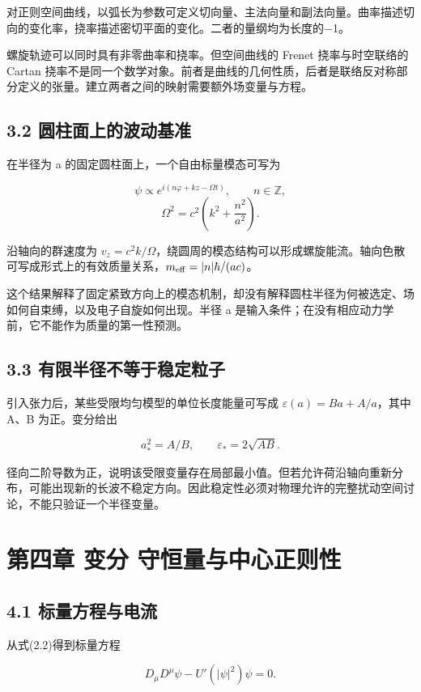 \documentclass[UTF8,fontset=fandol,11pt]{ctexart}
\begin{document}
对正则空间曲线，以弧长为参数可定义切向量、主法向量和副法向量。曲率描述切向的变化率，挠率描述密切平面的变化。二者的量纲均为长度的−1。

螺旋轨迹可以同时具有非零曲率和挠率。但空间曲线的 Frenet 挠率与时空联络的 Cartan 挠率不是同一个数学对象。前者是曲线的几何性质，后者是联络反对称部分定义的张量。建立两者之间的映射需要额外场变量与方程。

\subsection*{3.2 圆柱面上的波动基准}

在半径为 a 的固定圆柱面上，一个自由标量模态可写为

\[
\psi\propto e^{i(n\varphi+kz-\Omega t)},\qquad n\in\mathbb Z,
\]
\[
\Omega^2=c^2\left(k^2+\frac{n^2}{a^2}\right).
\tag{3.1}
\]

沿轴向的群速度为 \(v_z=c^2k/\Omega\)，绕圆周的模态结构可以形成螺旋能流。轴向色散可写成形式上的有效质量关系，\(m_{\rm eff}=|n|\hbar/(ac)\)。

这个结果解释了固定紧致方向上的模态机制，却没有解释圆柱半径为何被选定、场如何自束缚，以及电子自旋如何出现。半径 a 是输入条件；在没有相应动力学前，它不能作为质量的第一性预测。

\subsection*{3.3 有限半径不等于稳定粒子}

引入张力后，某些受限均匀模型的单位长度能量可写成 \(\varepsilon(a)=Ba+A/a\)，其中 A、B 为正。变分给出

\[
a_*^2=A/B,\qquad \varepsilon_*=2\sqrt{AB}.
\tag{3.2}
\]

径向二阶导数为正，说明该受限变量存在局部最小值。但若允许荷沿轴向重新分布，可能出现新的长波不稳定方向。因此稳定性必须对物理允许的完整扰动空间讨论，不能只验证一个半径变量。

\section*{第四章 变分 守恒量与中心正则性}

\subsection*{4.1 标量方程与电流}

从式(2.2)得到标量方程

\[
D_\mu D^\mu\psi-U'(|\psi|^2)\psi=0.
\tag{4.1}
\]
\end{document}
